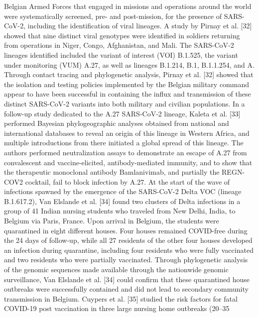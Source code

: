 Belgian Armed Forces that engaged in missions and operations around the world were systematically screened, pre- and post-mission, for the presence of SARS-CoV-2, including the identification of viral lineages. A study by Pirnay et al. [32] showed that nine distinct viral genotypes were identified in soldiers returning from operations in Niger, Congo, Afghanistan, and Mali. The SARS-CoV-2 lineages identified included the variant of interest (VOI) B.1.525, the variant under monitoring (VUM) A.27, as well as lineages B.1.214, B.1, B.1.1.254, and A. Through contact tracing and phylogenetic analysis, Pirnay et al. [32] showed that the isolation and testing policies implemented by the Belgian military command appear to have been successful in containing the influx and transmission of these distinct SARS-CoV-2 variants into both military and civilian populations. In a follow-up study dedicated to the A.27 SARS-CoV-2 lineage, Kaleta et al. [33] performed Bayesian phylogeographic analyses obtained from national and international databases to reveal an origin of this lineage in Western Africa, and multiple introductions from there initiated a global spread of this lineage. The authors performed neutralization assays to demonstrate an escape of A.27 from convalescent and vaccine-elicited, antibody-mediated immunity, and to show that the therapeutic monoclonal antibody Bamlanivimab, and partially the REGN-COV2 cocktail, fail to block infection by A.27.
At the start of the wave of infections spawned by the emergence of the SARS-CoV-2 Delta VOC (lineage B.1.617.2), Van Elslande et al. [34] found two clusters of Delta infections in a group of 41 Indian nursing students who traveled from New Delhi, India, to Belgium via Paris, France. Upon arrival in Belgium, the students were quarantined in eight different houses. Four houses remained COVID-free during the 24 days of follow-up, while all 27 residents of the other four houses developed an infection during quarantine, including four residents who were fully vaccinated and two residents who were partially vaccinated. Through phylogenetic analysis of the genomic sequences made available through the nationwide genomic surveillance, Van Elslande et al. [34] could confirm that these quarantined house outbreaks were successfully contained and did not lead to secondary community transmission in Belgium.
Cuypers et al. [35] studied the risk factors for fatal COVID-19 post vaccination in three large nursing home outbreaks (20–35%
